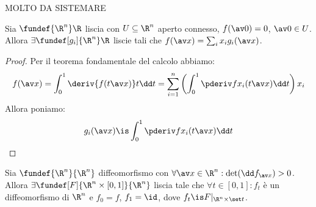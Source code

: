 
MOLTO DA SISTEMARE

\begin{lemma}
	\label{th:lemprec}
	Sia $\fundef{\R^n}\R$ liscia con $U\subseteq\R^n$ aperto connesso, $f(\av 0)=0$, $\av 0\in U$.
	Allora $\exists\fundef[g_i]{\R^n}\R$ liscie tali che $f(\av x)=\sum_ix_ig_i(\av x)$.
\end{lemma}

\begin{proof}
	Per il teorema fondamentale del calcolo abbiamo:
	\[f(\av x)=\int_0^1\deriv{f(t\av x)}t\dd t=
	\sum_{i=1}^n\left(\int_0^1\pderiv f{x_i}(t\av x)\dd t\right)x_i\]
	Allora poniamo:
	\[g_i(\av x)\is\int_0^1\pderiv f{x_i}(t\av x)\dd t
	\qedhere\]
\end{proof}

\begin{teo}
	Sia $\fundef{\R^n}{\R^n}$ diffeomorfismo con $\forall \av x\in\R^n:\det(\dd f_{\av x})>0$. Allora $\exists\fundef[F]{\R^n\times[0,1]}{\R^n}$ liscia tale che $\forall t\in[0,1]:f_t$ è un diffeomorfismo di $\R^n$ e $f_0=f$, $f_1=\id$, dove $f_t\is F|_{\R^n\times\set t}$.
\end{teo}

